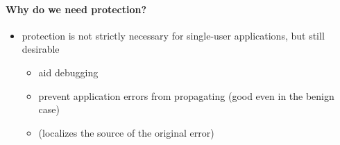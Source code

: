 \documentclass[
  12pt]{findlay}
\providecommand{\tightlist}{%
  \setlength{\itemsep}{0pt}\setlength{\parskip}{0pt}}
\begin{document}
\hypertarget{why-do-we-need-protection}{%
\paragraph{Why do we need protection?}\label{why-do-we-need-protection}}

\begin{itemize}
\tightlist
\item
  protection is not strictly necessary for single-user applications, but
  still desirable

  \begin{itemize}
  \tightlist
  \item
    aid debugging
  \item
    prevent application errors from propagating (good even in the benign
    case)
  \item
    (localizes the source of the original error)
  \end{itemize}
\end{itemize}

\printbibliography
\end{document}
